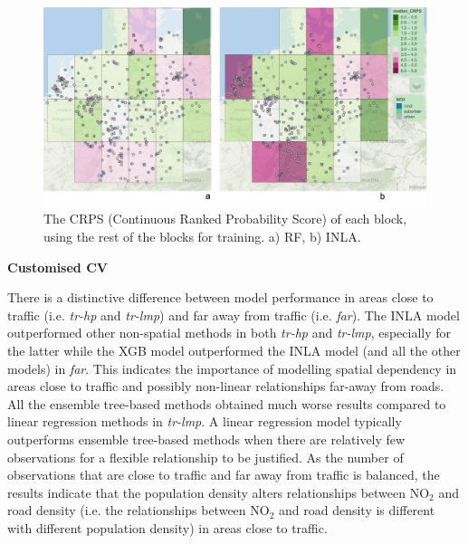 \documentclass{article}
\begin{document}
\begin{figure}
    \centering
    \includegraphics[scale=0.3]{fig/crps_RF_INLA.png}
    \caption{The CRPS (Continuous Ranked Probability Score) of each block, using the rest of the blocks for training. a) RF, b) INLA. 
}
    \label{fig:crps}
\end{figure}

\vspace{0.5cm}
\noindent \textbf{Customised CV}

There is a distinctive difference between model performance in areas close to traffic (i.e. \textit{tr-hp} and \textit{tr-lmp}) and far away from traffic (i.e. \textit{far}). The INLA model outperformed other non-spatial methods in both \textit{tr-hp} and \textit{tr-lmp}, especially for the latter while the XGB model outperformed the INLA model (and all the other models) in \textit{far}. This indicates the importance of modelling spatial dependency in areas close to traffic and possibly non-linear relationships far-away from roads. All the ensemble tree-based methods obtained much worse results compared to linear regression methods in \textit{tr-lmp}. A linear regression model typically outperforms ensemble tree-based methods when there are relatively few observations for a flexible relationship to be justified. As the number of observations that are close to traffic and far away from traffic is balanced, the results indicate that the population density alters relationships between NO$_2$ and road density (i.e. the relationships between NO$_2$ and road density is different with different population density) in areas close to traffic. 
\end{document}
